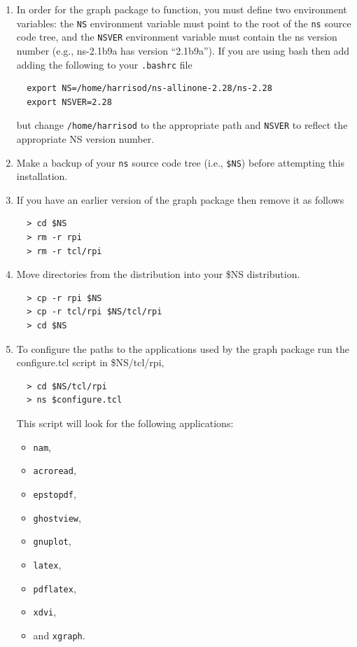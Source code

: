\documentclass[11pt]{article}
\begin{document}
\begin{enumerate}

\item{In order for the graph package to function, you must define two
environment variables: the \verb|NS| environment variable must point
to the root of the \verb|ns| source code tree, and the \verb|NSVER|
environment variable must contain the ns version number (e.g.,
ns-2.1b9a has version ``2.1b9a'').  If you are using bash then add
adding the following to your \verb|.bashrc| file}

\begin{verbatim}
  export NS=/home/harrisod/ns-allinone-2.28/ns-2.28
  export NSVER=2.28
\end{verbatim}

\noindent but change \verb|/home/harrisod| to the appropriate path 
and \verb|NSVER| to reflect the appropriate NS version number.

\item{Make a backup of your \verb|ns| source code tree (i.e.,
\verb|$NS|) before attempting this installation.}

\item{If you have an earlier version of the graph package then remove it 
      as follows}

\begin{verbatim}
  > cd $NS
  > rm -r rpi
  > rm -r tcl/rpi
\end{verbatim}

\item{Move directories from the distribution into your \$NS distribution.}
 
\begin{verbatim}
  > cp -r rpi $NS
  > cp -r tcl/rpi $NS/tcl/rpi
  > cd $NS
\end{verbatim}

\item To configure the paths to the applications used by the graph package
run the configure.tcl script in \$NS/tcl/rpi,

\begin{verbatim}
  > cd $NS/tcl/rpi
  > ns $configure.tcl
\end{verbatim}

This script will look for the following applications:

\begin{itemize}
  \item \verb|nam|,
  \item \verb|acroread|,
  \item \verb|epstopdf|,
  \item \verb|ghostview|, 
  \item \verb|gnuplot|,
  \item \verb|latex|,
  \item \verb|pdflatex|,
  \item \verb|xdvi|,
  \item and \verb|xgraph|.
\end{itemize}


\end{enumerate}
\end{document}
